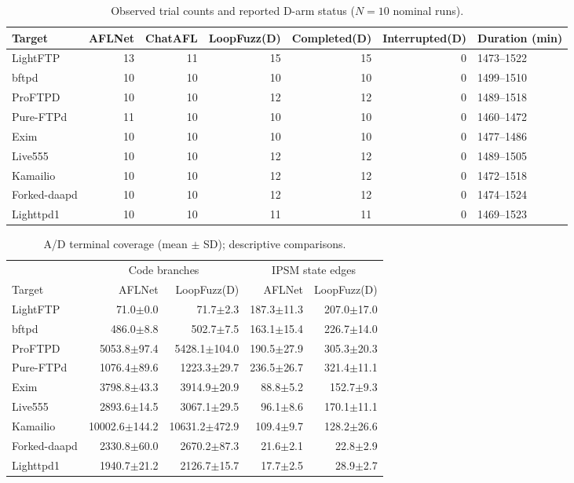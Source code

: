 \begin{table}[!tbp]
\centering\small
\caption{Observed trial counts and reported D-arm status ($N=10$ nominal runs).}
\label{tab:observed_inventory}
\begin{tabular}{lrrrrrl}
\toprule
Target & AFLNet & ChatAFL & LoopFuzz(D) & Completed(D) & Interrupted(D) & Duration (min) \\
\midrule
LightFTP & 13 & 11 & 15 & 15 & 0 & 1473--1522 \\
bftpd & 10 & 10 & 10 & 10 & 0 & 1499--1510 \\
ProFTPD & 10 & 10 & 12 & 12 & 0 & 1489--1518 \\
Pure-FTPd & 11 & 10 & 10 & 10 & 0 & 1460--1472 \\
Exim & 10 & 10 & 10 & 10 & 0 & 1477--1486 \\
Live555 & 10 & 10 & 12 & 12 & 0 & 1489--1505 \\
Kamailio & 10 & 10 & 12 & 12 & 0 & 1472--1518 \\
Forked-daapd & 10 & 10 & 12 & 12 & 0 & 1474--1524 \\
Lighttpd1 & 10 & 10 & 11 & 11 & 0 & 1469--1523 \\
\bottomrule
\end{tabular}
\end{table}
\begin{table}[!tbp]
\centering\small
\caption{A/D terminal coverage (mean $\pm$ SD); descriptive comparisons.}
\label{tab:observed_endpoints}
\begin{tabular}{lrrrr}
\toprule
 & \multicolumn{2}{c}{Code branches} & \multicolumn{2}{c}{IPSM state edges} \\
Target & AFLNet & LoopFuzz(D) & AFLNet & LoopFuzz(D) \\
\midrule
LightFTP & 71.0$\pm$0.0 & 71.7$\pm$2.3 & 187.3$\pm$11.3 & 207.0$\pm$17.0 \\
bftpd & 486.0$\pm$8.8 & 502.7$\pm$7.5 & 163.1$\pm$15.4 & 226.7$\pm$14.0 \\
ProFTPD & 5053.8$\pm$97.4 & 5428.1$\pm$104.0 & 190.5$\pm$27.9 & 305.3$\pm$20.3 \\
Pure-FTPd & 1076.4$\pm$89.6 & 1223.3$\pm$29.7 & 236.5$\pm$26.7 & 321.4$\pm$11.1 \\
Exim & 3798.8$\pm$43.3 & 3914.9$\pm$20.9 & 88.8$\pm$5.2 & 152.7$\pm$9.3 \\
Live555 & 2893.6$\pm$14.5 & 3067.1$\pm$29.5 & 96.1$\pm$8.6 & 170.1$\pm$11.1 \\
Kamailio & 10002.6$\pm$144.2 & 10631.2$\pm$472.9 & 109.4$\pm$9.7 & 128.2$\pm$26.6 \\
Forked-daapd & 2330.8$\pm$60.0 & 2670.2$\pm$87.3 & 21.6$\pm$2.1 & 22.8$\pm$2.9 \\
Lighttpd1 & 1940.7$\pm$21.2 & 2126.7$\pm$15.7 & 17.7$\pm$2.5 & 28.9$\pm$2.7 \\
\bottomrule
\end{tabular}
\end{table}
